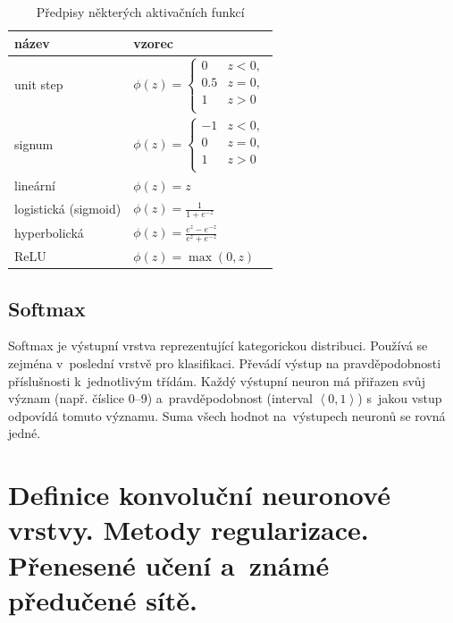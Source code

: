 \begin{table}[ht]
    \onehalfspacing
    \centering
    \begin{tabular}{|l|l|}
        název                & vzorec                                        \\ \hline \hline
        unit step            & $\phi(z) = \begin{cases}
                0   & z < 0, \\
                0.5 & z = 0, \\
                1   & z > 0  \\
            \end{cases}$        \\
        signum               & $\phi(z) = \begin{cases}
                -1 & z < 0, \\
                0  & z = 0, \\
                1  & z > 0  \\
            \end{cases}$        \\
        lineární             & $\phi(z) = z$                                 \\
        logistická (sigmoid) & $\phi(z) = \frac{1}{1 + e^{-z}}$              \\
        hyperbolická         & $\phi(z) = \frac{e^z - e^{-z}}{e^z + e^{-z}}$ \\
        ReLU                 & $\phi(z) = \max(0, z)$                        \\
    \end{tabular}
    \caption{Předpisy některých aktivačních funkcí}
\end{table}
\FloatBarrier

\subsection{Softmax}

Softmax je výstupní vrstva reprezentující kategorickou distribuci. Používá se zejména v~poslední vrstvě pro klasifikaci. Převádí výstup na pravděpodobnosti příslušnosti k~jednotlivým třídám.
Každý výstupní neuron má přiřazen svůj význam (např. číslice 0--9) a~pravděpodobnost (interval $\left<0, 1\right>$) s~jakou vstup odpovídá tomuto významu.
Suma všech hodnot na~výstupech neuronů se rovná jedné.

\clearpage
\section{Definice konvoluční neuronové vrstvy. Metody regularizace. Přenesené učení a~známé předučené sítě.}

